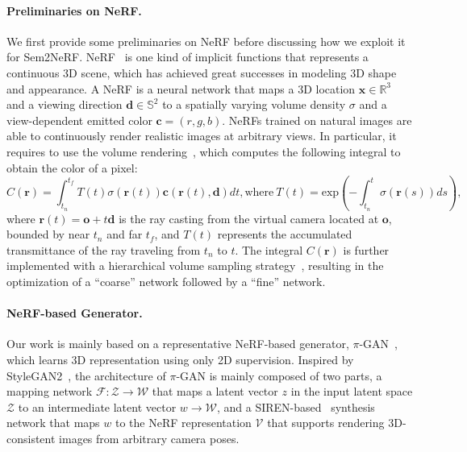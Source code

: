 \documentclass[runningheads]{llncs}
\begin{document}
\paragraph{\textbf{Preliminaries on NeRF.}} We first provide some preliminaries on NeRF before discussing how we exploit it for Sem2NeRF. NeRF~\cite{mildenhall2020nerf} is one kind of implicit functions that represents a continuous 3D scene, which has achieved great successes in modeling 3D shape and appearance. A NeRF is a neural network that maps a 3D location $\mathbf{x}\in\mathbb{R}^3$ and a viewing direction $\mathbf{d}\in\mathbb{S}^2$ to a spatially varying volume density $\sigma$ and a view-dependent emitted color $\mathbf{c} = (r, g, b)$. NeRFs trained on natural images are able to continuously render realistic images at arbitrary views. In particular, it requires to use the volume rendering~\cite{levoy1990efficient}, which computes the following integral to obtain the color of a pixel:
\begin{equation} \label{eq:volrender}
C(\mathbf{r}) = \int_{t_n}^{t_f}T(t)\sigma(\mathbf{r}(t))\mathbf{c}(\mathbf{r}(t), \mathbf{d})dt, \text{where}~T(t) = \text{exp}(-\int_{t_n}^{t}\sigma(\mathbf{r}(s))ds),
\end{equation}
where $\bm{r}(t) = \bm{o} + t\bm{d}$ is the ray casting from the virtual camera located at $\bm{o}$, bounded by near $t_n$ and far $t_f$, and $T(t)$ represents the accumulated transmittance of the ray traveling from $t_n$ to $t$. The integral $C(\mathbf{r})$ is further implemented with a hierarchical volume sampling strategy~\cite{levoy1990efficient,mildenhall2020nerf}, resulting in the optimization of a ``coarse'' network followed by a ``fine'' network.

\paragraph{\textbf{NeRF-based Generator.}} Our work is mainly based on a representative NeRF-based generator, $\pi$-GAN~\cite{chan2021pi}, which learns 3D representation using only 2D supervision. Inspired by StyleGAN2~\cite{karras2020analyzing}, the architecture of $\pi$-GAN is mainly composed of two parts, a mapping network $\mathcal{F}:\mathcal{Z}\to\mathcal{W}$ that maps a latent vector $z$ in the input latent space $\mathcal{Z}$ to an intermediate latent vector $w\to\mathcal{W}$, and a SIREN-based~\cite{sitzmann2020implicit} synthesis network that maps $w$ to the NeRF representation $\mathcal{V}$ that supports rendering 3D-consistent images from arbitrary camera poses.
\end{document}
